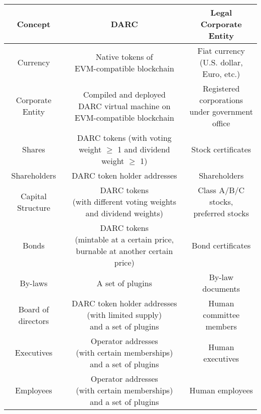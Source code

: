 \documentclass[main.tex]{subfiles}
\begin{document}
\begin{table}[h!]
\centering
\begin{tabular}{| c | c | c|} 
    \hline
    Concept & DARC & Legal Corporate Entity \\ [0.5ex] 
    \hline\hline

    Currency & \makecell{Native tokens of \\ EVM-compatible blockchain} & \makecell{Fiat currency \\ (U.S. dollar, Euro, etc.)} \\
    \hline
    Corporate Entity & \makecell{Compiled and deployed \\ DARC  virtual machine on \\  EVM-compatible blockchain} & \makecell{Registered corporations \\ under government office} \\
    \hline
    Shares & \makecell{DARC tokens \\ (with voting weight \(\ge\) 1 \\ and dividend weight \(\ge\) 1)} & Stock certificates \\
    \hline
    Shareholders & DARC token holder addresses & Shareholders \\
    \hline
    Capital Structure & \makecell{DARC tokens \\ (with different voting weights \\ and dividend weights)} & \makecell{Class A/B/C stocks, \\ preferred stocks } \\
    \hline
    Bonds & \makecell{DARC tokens \\ (mintable at a certain price, \\ burnable at another certain price)} & Bond certificates \\
    \hline
    By-laws & A set of plugins & By-law documents \\
    \hline 
    Board of directors & \makecell{DARC token holder addresses \\ (with limited supply) \\ and a set of plugins} & Human committee members  \\
    \hline
    Executives & \makecell{Operator addresses \\ (with certain memberships) \\ and a set of plugins} & Human executives \\
    \hline
    Employees & \makecell{Operator addresses \\ (with certain memberships) \\ and a set of plugins} & Human employees \\

\end{tabular}
\end{table}
\end{document}
